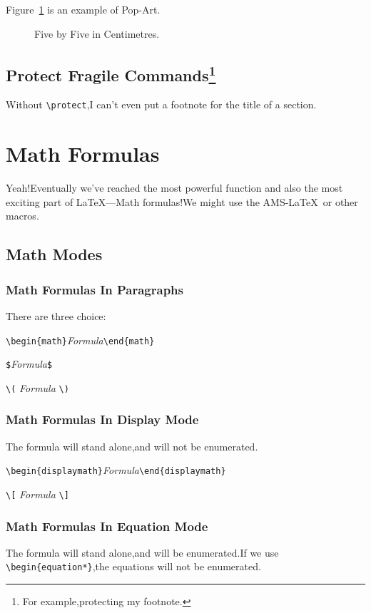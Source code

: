 \documentclass[a4paper]{report}
\begin{document}
Figure~\ref{Empty} is an example of Pop-Art.
\begin{figure}[!hbp]
\makebox[\textwidth]{\framebox[5cm]{\rule{0pt}{5cm}}} \caption{Five
by Five in Centimetres.} \label{Empty}
\end{figure}

\section{Protect Fragile Commands\protect\footnote{For example,protecting my footnote.}}
Without \verb|\protect|,I can't even put a footnote for the title of
a section.

\chapter{Math Formulas}
Yeah!Eventually we've reached the most powerful function and also
the most exciting part of \LaTeX---Math formulas!We might use the
AMS-\LaTeX\ or other macros.
\section{Math Modes}
\subsection{Math Formulas In Paragraphs}

There are three choice:

\verb|\begin{math}|\emph{Formula}\verb|\end{math}|

\verb|$|\emph{Formula}\verb|$|

\verb|\(| \emph{Formula} \verb|\)|

\subsection{Math Formulas In Display Mode}
The formula will stand alone,and will not be enumerated.

\verb|\begin{displaymath}|\emph{Formula}\verb|\end{displaymath}|

\verb|\[| \emph{Formula} \verb|\]|

\subsection{Math Formulas In Equation Mode}
The formula will stand alone,and will be enumerated.If we use
\verb|\begin{equation*}|,the equations will not be enumerated.
\end{document}
